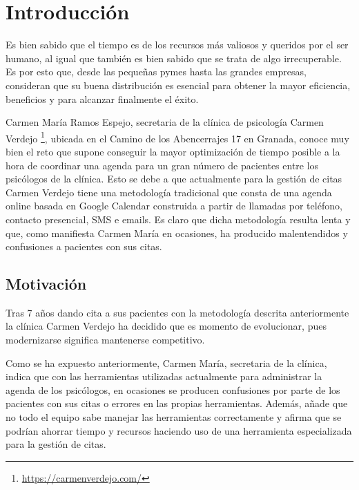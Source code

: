 \chapter{Introducción} \label{intro}
Es bien sabido que el tiempo es de los recursos más valiosos y queridos por el ser humano, al igual que también es bien sabido que se trata de algo irrecuperable. Es por esto que, desde las pequeñas pymes hasta las grandes empresas, consideran que su buena distribución es esencial para obtener la mayor eficiencia, beneficios y para alcanzar finalmente el éxito.\bigskip


Carmen María Ramos Espejo, secretaria de la clínica de psicología Carmen Verdejo \footnote{\url{https://carmenverdejo.com/}}, ubicada en el Camino de los Abencerrajes 17 en Granada, conoce muy bien el reto que supone conseguir la mayor optimización de tiempo posible a la hora de coordinar una agenda para un gran número de pacientes entre los psicólogos de la clínica. Esto se debe a que actualmente para la gestión de citas Carmen Verdejo tiene una metodología tradicional que consta de una agenda online basada en Google Calendar construida a partir de llamadas por teléfono, contacto presencial, SMS e emails. Es claro que dicha metodología resulta lenta y que, como manifiesta Carmen María en ocasiones, ha producido malentendidos y confusiones a pacientes con sus citas.\bigskip


\section{Motivación}
Tras 7 años dando cita a sus pacientes con la metodología descrita anteriormente la clínica Carmen Verdejo ha decidido que es momento de evolucionar, pues modernizarse significa mantenerse competitivo. \bigskip

Como se ha expuesto anteriormente, Carmen María, secretaria de la clínica, indica que con las herramientas utilizadas actualmente para administrar la agenda de los psicólogos, en ocasiones se producen confusiones por parte de los pacientes con sus citas o errores en las propias herramientas. Además, añade que no todo el equipo sabe manejar las herramientas correctamente y afirma que se podrían ahorrar tiempo y recursos haciendo uso de una herramienta especializada para la gestión de citas. \bigskip

